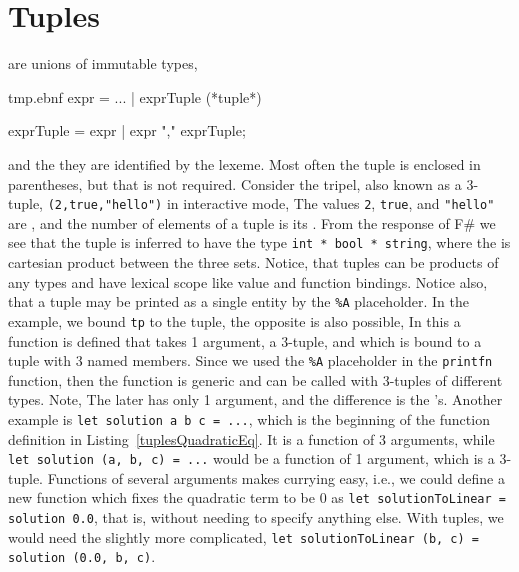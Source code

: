 \section{Tuples}
 are unions of immutable types, 
%
\begin{verbatimwrite}{tmp.ebnf}
expr = ... 
  | exprTuple (*tuple*)

exprTuple = expr | expr "," exprTuple;
\end{verbatimwrite}
%
and the they are identified by the \lexeme{,} lexeme. Most often the tuple is enclosed in parentheses, but that is not required. Consider the tripel, also known as a 3-tuple, \lstinline!(2,true,"hello")! in interactive mode,
%
%
The values \lstinline!2!, \lstinline!true!, and \lstinline!"hello"! are , and the number of elements of a tuple is its . From the response of F\# we see that the tuple is inferred to have the type \lstinline!int * bool * string!, where the \lexeme{*} is cartesian product between the three sets.  Notice, that tuples can be products of any types and have lexical scope like value and function bindings. Notice also, that a tuple may be printed as a single entity by the \lstinline!%A! placeholder. In the example, we bound \lstinline!tp! to the tuple, the opposite is also possible,
%
%
In this a function is defined that takes 1 argument, a 3-tuple, and which is bound to a tuple with 3 named members. Since we used the \lstinline!%A! placeholder in the \lstinline!printfn! function, then the function is generic and can be called with 3-tuples of different types. Note,   The later has only 1 argument, and the difference is the \lexeme{,}'s. Another example is \lstinline!let solution a b c = ...!, which is the beginning of the function definition in Listing~\ref{tuplesQuadraticEq}. It is a function of 3 arguments, while \lstinline!let solution (a, b, c) = ...! would be a function of 1 argument, which is a 3-tuple. Functions of several arguments makes currying easy, i.e., we could define a new function which fixes the quadratic term to be 0 as \lstinline!let solutionToLinear = solution 0.0!, that is, without needing to specify anything else. With tuples, we would need the slightly more complicated, \lstinline!let solutionToLinear (b, c) = solution (0.0, b, c)!.

